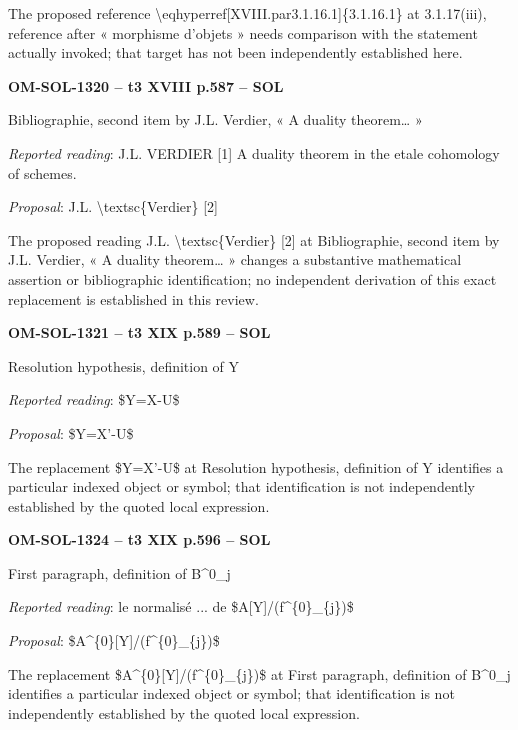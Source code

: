 The proposed reference \textbackslash{}eqhyperref[XVIII.par3.1.16.1]\{3.1.16.1\} at 3.1.17(iii), reference after « morphisme d'objets » needs comparison with the statement actually invoked; that target has not been independently established here.\par
\par\noindent\textbf{OM-SOL-1320 -- t3 XVIII p.587 -- SOL}\par
Bibliographie, second item by J.L. Verdier, « A duality theorem… »\par
\emph{Reported reading}: J.L. VERDIER [1] A duality theorem in the etale cohomology of schemes.\par
\emph{Proposal}: J.L. \textbackslash{}textsc\{Verdier\} [2]\par
The proposed reading J.L. \textbackslash{}textsc\{Verdier\} [2] at Bibliographie, second item by J.L. Verdier, « A duality theorem… » changes a substantive mathematical assertion or bibliographic identification; no independent derivation of this exact replacement is established in this review.\par
\par\noindent\textbf{OM-SOL-1321 -- t3 XIX p.589 -- SOL}\par
Resolution hypothesis, definition of Y\par
\emph{Reported reading}: \$Y=\allowbreak X-U\$\par
\emph{Proposal}: \$Y=\allowbreak X'-U\$\par
The replacement \$Y=\allowbreak X'-U\$ at Resolution hypothesis, definition of Y identifies a particular indexed object or symbol; that identification is not independently established by the quoted local expression.\par
\par\noindent\textbf{OM-SOL-1324 -- t3 XIX p.596 -- SOL}\par
First paragraph, definition of B\textasciicircum{}0\_j\par
\emph{Reported reading}: le normalisé ... de \$A[Y]/(f\textasciicircum{}\{0\}\_\{j\})\$\par
\emph{Proposal}: \$A\textasciicircum{}\{0\}[Y]/(f\textasciicircum{}\{0\}\_\{j\})\$\par
The replacement \$A\textasciicircum{}\{0\}[Y]/(f\textasciicircum{}\{0\}\_\{j\})\$ at First paragraph, definition of B\textasciicircum{}0\_j identifies a particular indexed object or symbol; that identification is not independently established by the quoted local expression.\par
